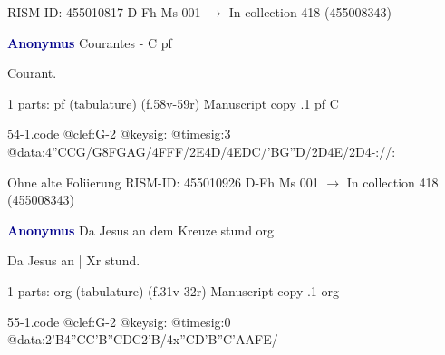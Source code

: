 \documentclass[twocolumn]{book}
\begin{document}
\newline RISM-ID: 455010817
\newline D-Fh  Ms 001
\newline $\rightarrow$ In collection 418 (455008343)
      
\newline \par \vspace{7pt} \textcolor{darkblue}{\textbf{Anonymus  }}
\newline Courantes - C
\newline pf
\newline \begin{itshape}[f.58v, at left:] Courant.\end{itshape} 
\newline \textcolor{darkblue}{}  1 parts: pf (tabulature)  (f.58v-59r)
\newline Manuscript copy
.1  pf  C  
\begin{filecontents*}{54-1.code}
@clef:G-2
@keysig:
@timesig:3
@data:4''CCG/G{8FGAG}/4FFF/2E4D/4EDC/'BG''D/2D4E/2D4-://:
\end{filecontents*}
\newline
%

\newline Ohne alte Foliierung
\newline RISM-ID: 455010926
\newline D-Fh  Ms 001
\newline $\rightarrow$ In collection 418 (455008343)
      
\newline \par \vspace{7pt} \textcolor{darkblue}{\textbf{Anonymus  }}
\newline Da Jesus an dem Kreuze stund
\newline org
\newline \begin{itshape}[f.31v, at left:] Da Jesus an | Xr stund.\end{itshape} 
\newline \textcolor{darkblue}{}  1 parts: org (tabulature)  (f.31v-32r)
\newline Manuscript copy
.1  org  
\begin{filecontents*}{55-1.code}
@clef:G-2
@keysig:
@timesig:0
@data:2'B4''CC'B''CDC2'B/4x''CD'B''C'AAFE/
\end{filecontents*}
\newline
%
\end{document}
